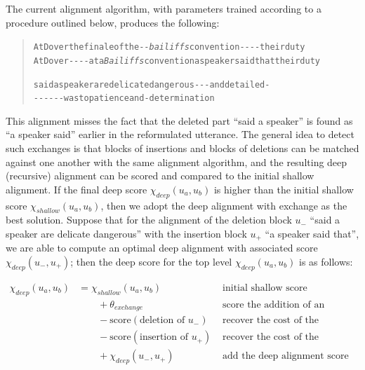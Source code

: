 \documentclass[a4paper,fleqn]{cas-dc}
\begin{document}
The current alignment algorithm, with parameters trained according to a
procedure outlined below, produces the following:

\begin{quote}\begin{alltt}\small
At Dover \textcolor{BrickRed}{the finale of the} -  - \emph{\textcolor{Sepia}{bailiffs}} convention - -       -    -    their duty
At Dover -   -      -  -   \textcolor{OliveGreen}{at a} \emph{\textcolor{Sepia}{Bailiffs}} convention \textcolor{OliveGreen}{a speaker said that} their duty

\textcolor{BrickRed}{said a speaker are delicate dangerous} -   -  -        and \textcolor{BrickRed}{detailed} -
-    - -       -   -        -         \textcolor{OliveGreen}{was to patience} and -         \textcolor{OliveGreen}{determination}
\end{alltt}\end{quote}

This alignment misses the fact that the deleted part \enquote{said a
speaker} is found as \enquote{a speaker said} earlier in the
reformulated utterance. The general idea to detect such exchanges is
that blocks of insertions and blocks of deletions can be matched against
one another with the same alignment algorithm, and the resulting deep
(recursive) alignment can be scored and compared to the initial shallow
alignment. If the final deep score \(\chi_{deep}(u_a, u_b)\) is higher
than the initial shallow score \(\chi_{shallow}(u_a, u_b)\), then we
adopt the deep alignment with exchange as the best solution. Suppose
that for the alignment of the deletion block \(u_-\) \enquote{said a
speaker are delicate dangerous} with the insertion block \(u_+\)
\enquote{a speaker said that}, we are able to compute an optimal deep
alignment with associated score \(\chi_{deep}(u_-, u_+)\); then the deep
score for the top level \(\chi_{deep}(u_a, u_b)\) is as follows:

\begin{align}
  \chi_{deep}(u_a, u_b) & = \chi_{shallow}(u_a, u_b) & & \text{initial shallow score} \nonumber \\
              &\qquad {} + \theta_{exchange} & & \text{score the addition of an exchange operation} \nonumber \\
              &\qquad {} - \text{score}(\text{deletion of }u_-) & & \text{recover the cost of the deletion block} \nonumber \\
              &\qquad {} - \text{score}(\text{insertion of }u_+) & & \text{recover the cost of the insertion block} \nonumber \\
              &\qquad {} + \chi_{deep}(u_-, u_+) & & \text{add the deep alignment score of the exchange} \label{eq:exchange-score}
\end{align}
\end{document}
